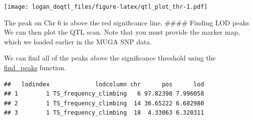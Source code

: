 \documentclass[]{article}
\newenvironment{Shaded}{\begin{snugshade}}{\end{snugshade}}
\newcommand{\KeywordTok}[1]{\textcolor[rgb]{0.13,0.29,0.53}{\textbf{#1}}}
\newcommand{\DataTypeTok}[1]{\textcolor[rgb]{0.13,0.29,0.53}{#1}}
\newcommand{\DecValTok}[1]{\textcolor[rgb]{0.00,0.00,0.81}{#1}}
\newcommand{\FloatTok}[1]{\textcolor[rgb]{0.00,0.00,0.81}{#1}}
\newcommand{\StringTok}[1]{\textcolor[rgb]{0.31,0.60,0.02}{#1}}
\newcommand{\OperatorTok}[1]{\textcolor[rgb]{0.81,0.36,0.00}{\textbf{#1}}}
\newcommand{\NormalTok}[1]{#1}
\begin{document}
\begin{Shaded}
\end{Shaded}

\texttt{[image: logan\_doqtl\_files/figure-latex/qtl\_plot\_thr-1.pdf]}

The peak on Chr 6 is above the red significance line. \#\#\#\# Finding
LOD peaks We can then plot the QTL scan. Note that you must provide the
marker map, which we loaded earlier in the MUGA SNP data.

We can find all of the peaks above the significance threshold using the
\href{https://github.com/rqtl/qtl2/blob/master/R/find_peaks.R}{find\_peaks}
function.

\begin{Shaded}
\end{Shaded}

\begin{verbatim}
##   lodindex             lodcolumn chr      pos      lod
## 1        1 TS_frequency_climbing   6 97.82398 7.996058
## 2        1 TS_frequency_climbing  14 36.65222 6.682980
## 3        1 TS_frequency_climbing  18  4.33063 6.320311
\end{verbatim}
\end{document}
